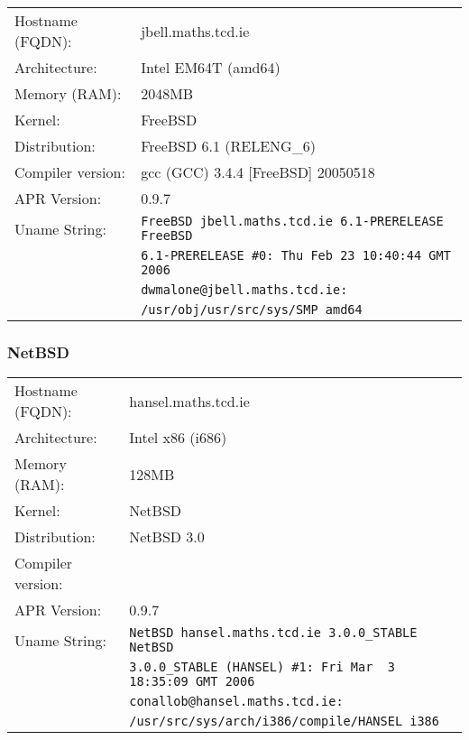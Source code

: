 \begin{tabular}{ll}
Hostname (FQDN):	&	jbell.maths.tcd.ie 				\\
Architecture:		&	Intel EM64T (amd64)				\\
Memory (RAM):		&	2048MB								\\
Kernel:				&	FreeBSD								\\
Distribution:		&	FreeBSD 6.1 (RELENG\_6)			\\
Compiler version:	&	gcc (GCC) 3.4.4 [FreeBSD] 20050518\\
APR Version:		&	0.9.7									\\
Uname String:		& \verb!FreeBSD jbell.maths.tcd.ie 6.1-PRERELEASE FreeBSD!\\
						& \verb!6.1-PRERELEASE #0: Thu Feb 23 10:40:44 GMT 2006! \\
						& \verb!dwmalone@jbell.maths.tcd.ie:!\\
						& \verb!/usr/obj/usr/src/sys/SMP amd64! \\
\end{tabular}

\subsubsection{NetBSD}

\begin{tabular}{ll}
Hostname (FQDN):	&	hansel.maths.tcd.ie 				\\
Architecture:		&	Intel x86 (i686)					\\
Memory (RAM):		&	128MB									\\
Kernel:				&	NetBSD								\\
Distribution:		&	NetBSD 3.0							\\
Compiler version:	&											\\
APR Version:		&	0.9.7									\\
Uname String:		& \verb!NetBSD hansel.maths.tcd.ie 3.0.0_STABLE NetBSD!\\
						& \verb!3.0.0_STABLE (HANSEL) #1: Fri Mar  3 18:35:09 GMT 2006!\\
						& \verb!conallob@hansel.maths.tcd.ie:!\\
						& \verb!/usr/src/sys/arch/i386/compile/HANSEL i386!\\
\end{tabular}


